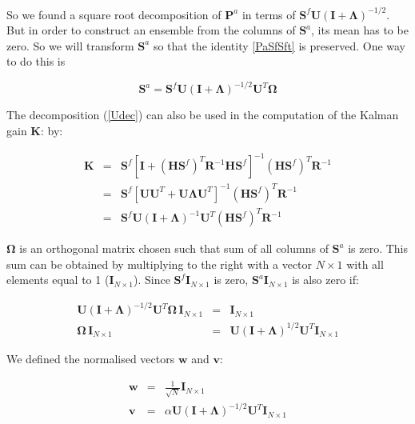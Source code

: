 \documentclass[a4paper,12pt]{article}
\begin{document}
So we found a square root decomposition of $\mathbf{P}^a$ in terms of $\mathbf{S}^f\mathbf{U}(\mathbf I + \mathbf \Lambda)^{-1/2}$. But in order to construct an ensemble from the columns of $\mathbf S^a$, its mean has to be zero. So we will transform $\mathbf S^a$ so that the identity \eqref{PaSfSft} is preserved. One way to do this is

\begin{equation}
   \mathbf S^a = \mathbf S^f \mathbf U (\mathbf I + \mathbf \Lambda)^{-1/2} \mathbf U^T \mathbf \Omega
\end{equation}


The decomposition (\ref{Udec}) can also be used in the computation of the Kalman gain $\mathbf K$:
by:

\begin{eqnarray}
 \mathbf K 
&=&
\mathbf S^f
\left[
\mathbf I + (\mathbf H \mathbf S^f)^T\mathbf R^{-1} \mathbf H \mathbf S^f 
\right]^{-1}
(\mathbf H \mathbf S^f)^T\mathbf R^{-1} \\
&=&
\mathbf S^f
\left[
\mathbf U \mathbf U^T + \mathbf U \mathbf \Lambda \mathbf U^T
\right]^{-1}
(\mathbf H \mathbf S^f)^T\mathbf R^{-1} \\
&=&
 \mathbf S^f \mathbf U (\mathbf I + \mathbf \Lambda)^{-1} \mathbf U^T (\mathbf H \mathbf S^f)^T \mathbf R^{-1}\label{KU}
\end{eqnarray}

\newcommand{\one}{ \mathbf I_{N \times 1}}

$\mathbf \Omega$ is an orthogonal matrix chosen such that sum of all columns of $\mathbf S^a$ is zero. This sum can be obtained by multiplying to the right with a vector $N \times 1$ with all elements equal to 1 ($\one$). Since $\mathbf S^f \one$ is zero, $\mathbf S^a \one$ is also zero if:

\begin{eqnarray}
  \mathbf U (\mathbf I + \mathbf \Lambda)^{-1/2} \mathbf U^T \mathbf \Omega \, \one &=& \one \\
  \mathbf \Omega \, \one &=& \mathbf U (\mathbf I + \mathbf \Lambda)^{1/2} \mathbf U^T \one
\end{eqnarray}

We defined the normalised vectors $\mathbf w$ and $\mathbf v$:

\begin{eqnarray}
  \mathbf w &=& \frac{1}{\sqrt{N}} \one \\
  \mathbf v &=& \alpha \mathbf U (\mathbf I + \mathbf \Lambda)^{-1/2} \mathbf U^T \one
\end{eqnarray}
\end{document}
